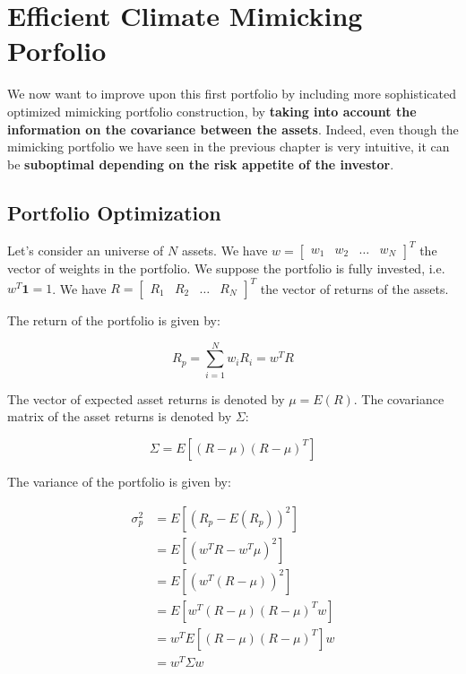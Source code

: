 \chapter{Efficient Climate Mimicking Porfolio}
 
We now want to improve upon this first portfolio 
by including more sophisticated optimized mimicking 
portfolio construction, by \textbf{taking into account 
the information on the covariance between the 
assets}. Indeed, even though the mimicking portfolio we have 
seen in the previous chapter is very intuitive, 
it can be \textbf{suboptimal depending on the 
risk appetite of the investor}.

\section{Portfolio Optimization}

Let's consider an universe of $N$ assets. 
We have $w = \begin{bmatrix}
    w_1 & w_2 & \ldots & w_N
\end{bmatrix}^T$ the vector of weights in the
portfolio.
We suppose the portfolio is fully invested, i.e.
$w^T \mathbf{1} = 1$.
We have $R = \begin{bmatrix}
    R_1 & R_2 & \ldots & R_N
\end{bmatrix}^T$ the vector of returns of the assets.

The return of the portfolio is given by:

\begin{equation}
    R_p = \sum^N_{i=1} w_i R_i = w^T R
\end{equation}

The vector of expected asset returns is denoted by $\mu = E(R)$.
The covariance matrix of the asset returns is denoted by $\Sigma$:

\begin{equation}
    \Sigma = E[(R - \mu)(R - \mu)^T]
\end{equation}

The variance of the portfolio is given by:

\begin{equation}
    \begin{aligned}
        \sigma^2_p &= E[(R_p - E(R_p))^2] \\
        &= E[(w^T R - w^T \mu)^2] \\
        &= E[(w^T (R - \mu))^2] \\
        &= E[w^T (R - \mu)(R - \mu)^T w] \\
        &= w^T E[(R - \mu)(R - \mu)^T] w \\
        &= w^T \Sigma w
    \end{aligned}
\end{equation}


